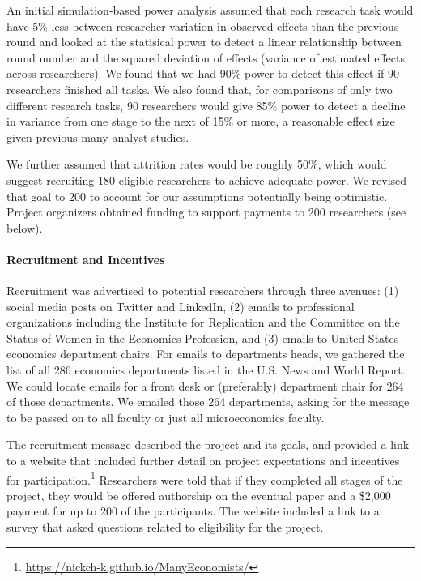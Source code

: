 \documentclass[
  letterpaper,
  DIV=11,
  numbers=noendperiod]{scrartcl}
\let\oldparagraph\paragraph
\renewcommand{\paragraph}[1]{\oldparagraph{#1}\mbox{}}
\begin{document}
\label{sec-target-sample}

An initial simulation-based power analysis assumed that each research
task would have 5\% less between-researcher variation in observed
effects than the previous round and looked at the statisical power to
detect a linear relationship between round number and the squared
deviation of effects (variance of estimated effects across researchers).
We found that we had 90\% power to detect this effect if 90 researchers
finished all tasks. We also found that, for comparisons of only two
different research tasks, 90 researchers would give 85\% power to detect
a decline in variance from one stage to the next of 15\% or more, a
reasonable effect size given previous many-analyst studies.

We further assumed that attrition rates would be roughly 50\%, which
would suggest recruiting 180 eligible researchers to achieve adequate
power. We revised that goal to 200 to account for our assumptions
potentially being optimistic. Project organizers obtained funding to
support payments to 200 researchers (see below).

\hypertarget{recruitment-and-incentives}{%
\paragraph{Recruitment and
Incentives}\label{recruitment-and-incentives}}

Recruitment was advertised to potential researchers through three
avenues: (1) social media posts on Twitter and LinkedIn, (2) emails to
professional organizations including the Institute for Replication and
the Committee on the Status of Women in the Economics Profession, and
(3) emails to United States economics department chairs. For emails to
departments heads, we gathered the list of all 286 economics departments
listed in the U.S. News and World Report. We could locate emails for a
front desk or (preferably) department chair for 264 of those
departments. We emailed those 264 departments, asking for the message to
be passed on to all faculty or just all microeconomics faculty.

The recruitment message described the project and its goals, and
provided a link to a website that included further detail on project
expectations and incentives for participation.\footnote{\url{https://nickch-k.github.io/ManyEconomists/}}
Researchers were told that if they completed all stages of the project,
they would be offered authorship on the eventual paper and a \$2,000
payment for up to 200 of the participants. The website included a link
to a survey that asked questions related to eligibility for the project.
\end{document}
